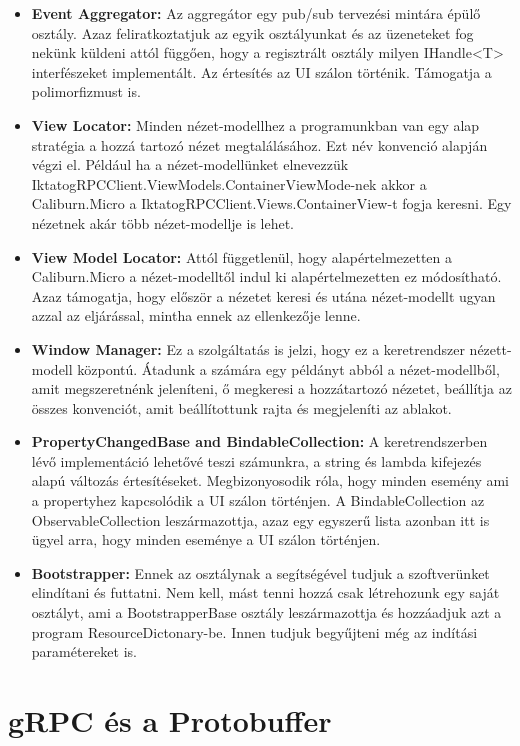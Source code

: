 \documentclass[
]{thesis-ekf}
\theoremstyle{definition}
\theoremstyle{remark}
\begin{document}
\begin{itemize}[leftmargin=*]
\item \textbf{Event Aggregator:  }Az aggregátor egy pub/sub tervezési mintára épülő osztály. Azaz feliratkoztatjuk az egyik osztályunkat és az üzeneteket fog nekünk küldeni attól függően, hogy a regisztrált osztály milyen IHandle<T> interfészeket implementált. Az értesítés az UI szálon történik. Támogatja a polimorfizmust is. 
\item \textbf{View Locator:  }Minden nézet-modellhez a programunkban van egy alap stratégia a hozzá tartozó nézet megtalálásához. Ezt név konvenció alapján végzi el. Például ha a nézet-modellünket elnevezzük IktatogRPCClient.ViewModels.ContainerViewMode-nek akkor a Caliburn.Micro a IktatogRPCClient.Views.ContainerView-t fogja keresni. Egy nézetnek akár több nézet-modellje is lehet. 
\item \textbf{View Model Locator: }	Attól függetlenül, hogy alapértelmezetten a Caliburn.Micro a nézet-modelltől indul ki alapértelmezetten ez módosítható. Azaz támogatja, hogy először a nézetet keresi és utána nézet-modellt ugyan azzal az eljárással, mintha ennek az ellenkezője lenne. 
\item \textbf{Window Manager: }Ez a szolgáltatás is jelzi, hogy ez a keretrendszer nézett-modell központú. Átadunk a számára egy példányt abból a nézet-modellből, amit megszeretnénk jeleníteni, ő megkeresi a hozzátartozó nézetet, beállítja az összes konvenciót, amit beállítottunk rajta és megjeleníti az ablakot. 
\item \textbf{PropertyChangedBase and BindableCollection: }	A keretrendszerben lévő implementáció lehetővé teszi számunkra, a string és lambda kifejezés alapú változás értesítéseket. Megbizonyosodik róla, hogy minden esemény ami a propertyhez kapcsolódik a UI szálon történjen. A BindableCollection az ObservableCollection leszármazottja, azaz egy egyszerű lista azonban itt is ügyel arra, hogy minden eseménye a UI szálon történjen.
\item \textbf{Bootstrapper: }Ennek az osztálynak a segítségével tudjuk a szoftverünket elindítani és futtatni. Nem kell, mást tenni hozzá csak létrehozunk egy saját osztályt, ami a BootstrapperBase osztály leszármazottja és hozzáadjuk azt a program ResourceDictonary-be. Innen tudjuk begyűjteni még az indítási paramétereket is.
\end{itemize}
\section{gRPC és a Protobuffer}
\end{document}
